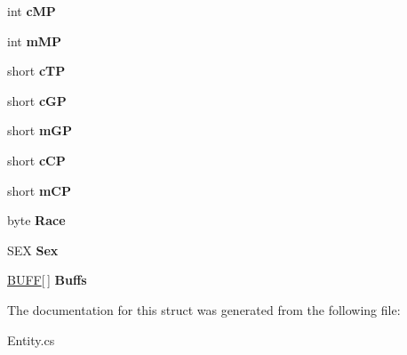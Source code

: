 \begin{DoxyCompactItemize}
\item 
\hypertarget{structffxivlib_1_1_entity_1_1_e_n_t_i_t_y_i_n_f_o_a81af69b94f15abeba9263682bd805ab5}{int {\bfseries c\-M\-P}}\label{structffxivlib_1_1_entity_1_1_e_n_t_i_t_y_i_n_f_o_a81af69b94f15abeba9263682bd805ab5}

\item 
\hypertarget{structffxivlib_1_1_entity_1_1_e_n_t_i_t_y_i_n_f_o_a3aad5eb2ed4ecff5e902cd054daf2d9b}{int {\bfseries m\-M\-P}}\label{structffxivlib_1_1_entity_1_1_e_n_t_i_t_y_i_n_f_o_a3aad5eb2ed4ecff5e902cd054daf2d9b}

\item 
\hypertarget{structffxivlib_1_1_entity_1_1_e_n_t_i_t_y_i_n_f_o_a680dced63aeb961d2d7ff24372f0b3df}{short {\bfseries c\-T\-P}}\label{structffxivlib_1_1_entity_1_1_e_n_t_i_t_y_i_n_f_o_a680dced63aeb961d2d7ff24372f0b3df}

\item 
\hypertarget{structffxivlib_1_1_entity_1_1_e_n_t_i_t_y_i_n_f_o_a905fc67478130ba6433fe2b9b4d0ddec}{short {\bfseries c\-G\-P}}\label{structffxivlib_1_1_entity_1_1_e_n_t_i_t_y_i_n_f_o_a905fc67478130ba6433fe2b9b4d0ddec}

\item 
\hypertarget{structffxivlib_1_1_entity_1_1_e_n_t_i_t_y_i_n_f_o_a27e352e8bc836e304bf2e894bb5e8763}{short {\bfseries m\-G\-P}}\label{structffxivlib_1_1_entity_1_1_e_n_t_i_t_y_i_n_f_o_a27e352e8bc836e304bf2e894bb5e8763}

\item 
\hypertarget{structffxivlib_1_1_entity_1_1_e_n_t_i_t_y_i_n_f_o_a5dbc987ec84d02225a56549219a72670}{short {\bfseries c\-C\-P}}\label{structffxivlib_1_1_entity_1_1_e_n_t_i_t_y_i_n_f_o_a5dbc987ec84d02225a56549219a72670}

\item 
\hypertarget{structffxivlib_1_1_entity_1_1_e_n_t_i_t_y_i_n_f_o_a4672bd0fd646d4eea56955cb07f41998}{short {\bfseries m\-C\-P}}\label{structffxivlib_1_1_entity_1_1_e_n_t_i_t_y_i_n_f_o_a4672bd0fd646d4eea56955cb07f41998}

\item 
\hypertarget{structffxivlib_1_1_entity_1_1_e_n_t_i_t_y_i_n_f_o_a699875cd7898172929592fd6b407c68c}{byte {\bfseries Race}}\label{structffxivlib_1_1_entity_1_1_e_n_t_i_t_y_i_n_f_o_a699875cd7898172929592fd6b407c68c}

\item 
\hypertarget{structffxivlib_1_1_entity_1_1_e_n_t_i_t_y_i_n_f_o_a53d07d9b89bec006286483c633cfc616}{S\-E\-X {\bfseries Sex}}\label{structffxivlib_1_1_entity_1_1_e_n_t_i_t_y_i_n_f_o_a53d07d9b89bec006286483c633cfc616}

\item 
\hypertarget{structffxivlib_1_1_entity_1_1_e_n_t_i_t_y_i_n_f_o_aeb8a58b94d8da93ab2c21a658d8a1f8e}{\hyperlink{structffxivlib_1_1_b_u_f_f}{B\-U\-F\-F}\mbox{[}$\,$\mbox{]} {\bfseries Buffs}}\label{structffxivlib_1_1_entity_1_1_e_n_t_i_t_y_i_n_f_o_aeb8a58b94d8da93ab2c21a658d8a1f8e}

\end{DoxyCompactItemize}


The documentation for this struct was generated from the following file\-:\begin{DoxyCompactItemize}
\item 
Entity.\-cs\end{DoxyCompactItemize}
